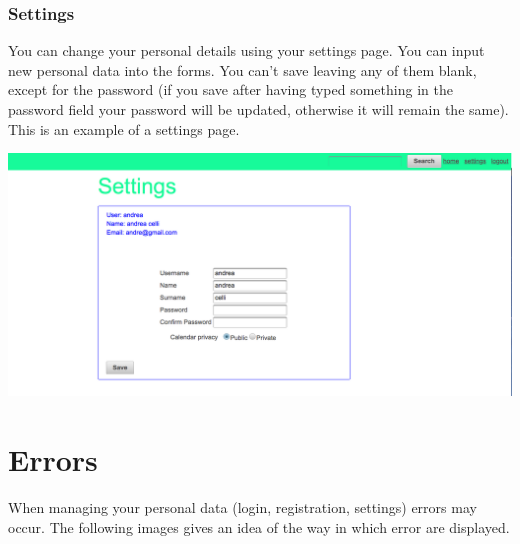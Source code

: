 \documentclass[10pt,a4paper,titlepage]{article}
\begin{document}
\section{Settings}
You can change your personal details using your settings page. You can input new personal data into the forms. You can’t save leaving any of them blank, except for the password (if you save after having typed something in the password field your password will be updated, otherwise it will remain the same). This is an example of a settings page.

\begin{center}
\includegraphics[width=\linewidth]{./images/29_settings}
\end{center}

\part{Errors}
When managing your personal data (login, registration, settings) errors may occur. The following images gives an idea of the way in which error are displayed.
\end{document}
